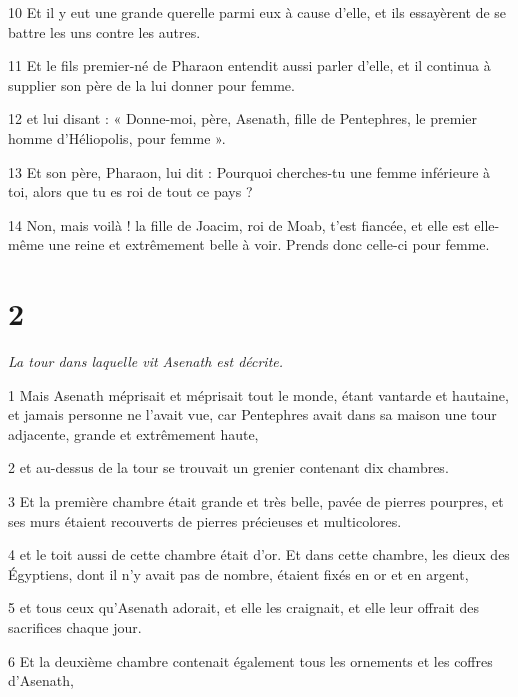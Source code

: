\par 10 Et il y eut une grande querelle parmi eux à cause d'elle, et ils essayèrent de se battre les uns contre les autres.

\par 11 Et le fils premier-né de Pharaon entendit aussi parler d'elle, et il continua à supplier son père de la lui donner pour femme.

\par 12 et lui disant : « Donne-moi, père, Asenath, fille de Pentephres, le premier homme d'Héliopolis, pour femme ».

\par 13 Et son père, Pharaon, lui dit : Pourquoi cherches-tu une femme inférieure à toi, alors que tu es roi de tout ce pays ?

\par 14 Non, mais voilà ! la fille de Joacim, roi de Moab, t'est fiancée, et elle est elle-même une reine et extrêmement belle à voir. Prends donc celle-ci pour femme.

\chapter{2}

\par \textit{La tour dans laquelle vit Asenath est décrite.}

\par 1 Mais Asenath méprisait et méprisait tout le monde, étant vantarde et hautaine, et jamais personne ne l'avait vue, car Pentephres avait dans sa maison une tour adjacente, grande et extrêmement haute,

\par 2 et au-dessus de la tour se trouvait un grenier contenant dix chambres.

\par 3 Et la première chambre était grande et très belle, pavée de pierres pourpres, et ses murs étaient recouverts de pierres précieuses et multicolores.

\par 4 et le toit aussi de cette chambre était d'or. Et dans cette chambre, les dieux des Égyptiens, dont il n’y avait pas de nombre, étaient fixés en or et en argent,

\par 5 et tous ceux qu'Asenath adorait, et elle les craignait, et elle leur offrait des sacrifices chaque jour.

\par 6 Et la deuxième chambre contenait également tous les ornements et les coffres d'Asenath,

